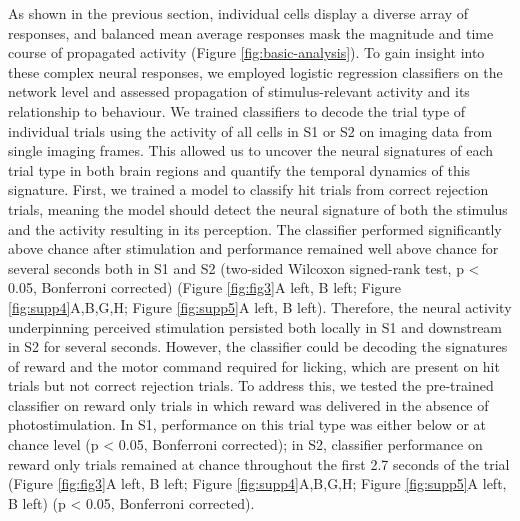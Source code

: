As shown in the previous section, individual cells display a diverse array of responses, and balanced mean average responses mask the magnitude and time course of propagated activity (Figure \ref{fig:basic-analysis}). To gain insight into these complex neural responses, we employed logistic regression classifiers on the network level and assessed propagation of stimulus-relevant activity and its relationship to behaviour. We trained classifiers to decode the trial type of individual trials using the activity of all cells in S1 or S2 on imaging data from single imaging frames. This allowed us to uncover the neural signatures of each trial type in both brain regions and quantify the temporal dynamics of this signature. First, we trained a model to classify hit trials from correct rejection trials, meaning the model should detect the neural signature of both the stimulus and the activity resulting in its perception. The classifier performed significantly above chance after stimulation and performance remained well above chance for several seconds both in S1 and S2 (two-sided Wilcoxon signed-rank test, p < 0.05, Bonferroni corrected) (Figure \ref{fig:fig3}A left, B left; Figure \ref{fig:supp4}A,B,G,H; Figure \ref{fig:supp5}A left, B left). Therefore, the neural activity underpinning perceived stimulation persisted both locally in S1 and downstream in S2 for several seconds. However, the classifier could be decoding the signatures of reward and the motor command required for licking, which are present on hit trials but not correct rejection trials. To address this, we tested the pre-trained classifier on reward only trials in which reward was delivered in the absence of photostimulation. In S1, performance on this trial type was either below or at chance level (p < 0.05, Bonferroni corrected); in S2, classifier performance on reward only trials remained at chance throughout the first 2.7 seconds of the trial (Figure \ref{fig:fig3}A left, B left; Figure \ref{fig:supp4}A,B,G,H; Figure \ref{fig:supp5}A left, B left) (p < 0.05, Bonferroni corrected). 


